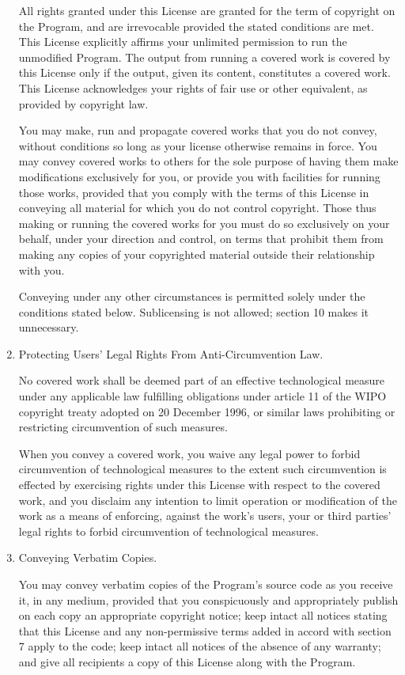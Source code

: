 \begin{enumerate}
	All rights granted under this License are granted for the term of
	copyright on the Program, and are irrevocable provided the stated
	conditions are met.  This License explicitly affirms your unlimited
	permission to run the unmodified Program.  The output from running a
	covered work is covered by this License only if the output, given its
	content, constitutes a covered work.  This License acknowledges your
	rights of fair use or other equivalent, as provided by copyright law.
	
	You may make, run and propagate covered works that you do not
	convey, without conditions so long as your license otherwise remains
	in force.  You may convey covered works to others for the sole purpose
	of having them make modifications exclusively for you, or provide you
	with facilities for running those works, provided that you comply with
	the terms of this License in conveying all material for which you do
	not control copyright.  Those thus making or running the covered works
	for you must do so exclusively on your behalf, under your direction
	and control, on terms that prohibit them from making any copies of
	your copyrighted material outside their relationship with you.
	
	Conveying under any other circumstances is permitted solely under
	the conditions stated below.  Sublicensing is not allowed; section 10
	makes it unnecessary.
	
	\item Protecting Users' Legal Rights From Anti-Circumvention Law.
	
	No covered work shall be deemed part of an effective technological
	measure under any applicable law fulfilling obligations under article
	11 of the WIPO copyright treaty adopted on 20 December 1996, or
	similar laws prohibiting or restricting circumvention of such
	measures.
	
	When you convey a covered work, you waive any legal power to forbid
	circumvention of technological measures to the extent such circumvention
	is effected by exercising rights under this License with respect to
	the covered work, and you disclaim any intention to limit operation or
	modification of the work as a means of enforcing, against the work's
	users, your or third parties' legal rights to forbid circumvention of
	technological measures.
	
	\item Conveying Verbatim Copies.
	
	You may convey verbatim copies of the Program's source code as you
	receive it, in any medium, provided that you conspicuously and
	appropriately publish on each copy an appropriate copyright notice;
	keep intact all notices stating that this License and any
	non-permissive terms added in accord with section 7 apply to the code;
	keep intact all notices of the absence of any warranty; and give all
	recipients a copy of this License along with the Program.
	

\end{enumerate}
